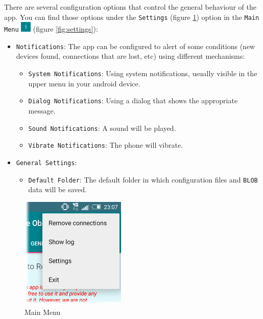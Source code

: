 There are several configuration options that control the general behaviour of the app. You can find those options under the \texttt{Settings} (figure \ref{fig:mainMenu}) option in the \texttt{Main Menu} \includegraphics[width=0.5cm]{../images/mainMenuButton.png} (figure \ref{fig:settings}):

\begin{itemize}
  \item \texttt{Notifications}: The app can be configured to alert of some conditions (new devices found, connections that are lost, etc) using different mechanisms:
  
  \begin{itemize}
    \item \texttt{System Notifications}: Using system notifications, usually visible in the upper menu in your android device.
    \item \texttt{Dialog Notifications}: Using a dialog that shows the appropriate message.
    \item \texttt{Sound Notifications}: A sound will be played.
    \item \texttt{Vibrate Notifications}: The phone will vibrate.
  \end{itemize}
  
  
  \item \texttt{General Settings}:
  \begin{itemize}
    \item \texttt{Default Folder}: The default folder in which configuration files and \texttt{BLOB} data will be saved.
  \end{itemize}
  

\end{itemize}


\begin{figure}
 \centering
 \includegraphics[width=5cm]{../images/mainMenu2.png}
 \caption{Main Menu}
 \label{fig:mainMenu}
\end{figure}

